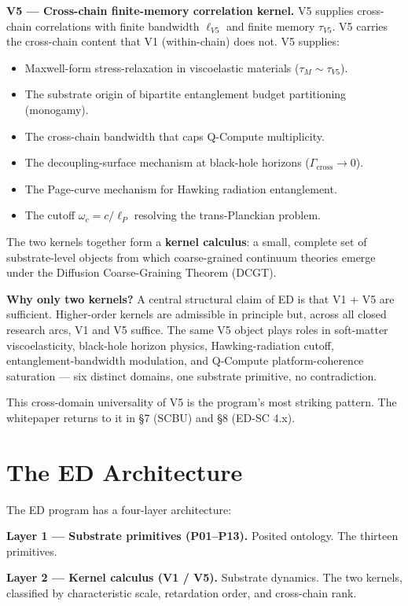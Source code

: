 \documentclass[11pt,a4paper]{article}
\begin{document}
\textbf{V5 --- Cross-chain finite-memory correlation kernel.} V5 supplies cross-chain correlations with finite bandwidth $\ell_{V5}$ and finite memory $\tau_{V5}$. V5 carries the cross-chain content that V1 (within-chain) does not. V5 supplies:

\begin{itemize}[noitemsep]
\item Maxwell-form stress-relaxation in viscoelastic materials ($\tau_M \sim \tau_{V5}$).
\item The substrate origin of bipartite entanglement budget partitioning (monogamy).
\item The cross-chain bandwidth that caps Q-Compute multiplicity.
\item The decoupling-surface mechanism at black-hole horizons ($\Gamma_\mathrm{cross} \to 0$).
\item The Page-curve mechanism for Hawking radiation entanglement.
\item The cutoff $\omega_c = c/\ell_P$ resolving the trans-Planckian problem.
\end{itemize}

The two kernels together form a \textbf{kernel calculus}: a small, complete set of substrate-level objects from which coarse-grained continuum theories emerge under the Diffusion Coarse-Graining Theorem (DCGT).

\textbf{Why only two kernels?} A central structural claim of ED is that V1 + V5 are sufficient. Higher-order kernels are admissible in principle but, across all closed research arcs, V1 and V5 suffice. The same V5 object plays roles in soft-matter viscoelasticity, black-hole horizon physics, Hawking-radiation cutoff, entanglement-bandwidth modulation, and Q-Compute platform-coherence saturation --- six distinct domains, one substrate primitive, no contradiction.

This cross-domain universality of V5 is the program's most striking pattern. The whitepaper returns to it in \S7 (SCBU) and \S8 (ED-SC 4.x).

\section{The ED Architecture}

The ED program has a four-layer architecture:

\textbf{Layer 1 --- Substrate primitives (P01--P13).} Posited ontology. The thirteen primitives.

\textbf{Layer 2 --- Kernel calculus (V1 / V5).} Substrate dynamics. The two kernels, classified by characteristic scale, retardation order, and cross-chain rank.
\end{document}
